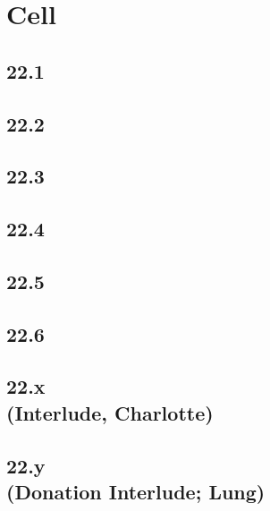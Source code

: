 \part{Cell}

 \chapter{22.1}

 \chapter{22.2}

 \chapter{22.3}

 \chapter{22.4}

 \chapter{22.5}

 \chapter{22.6}

 \chapter[22.x (Interlude, Charlotte)]{22.x\\(Interlude, Charlotte)}

 \chapter[22.y (Donation Interlude; Lung)]{22.y\\(Donation Interlude; Lung)}









